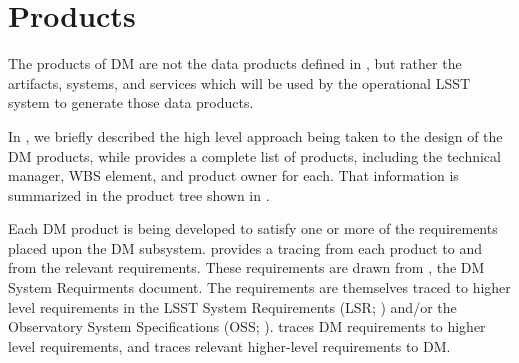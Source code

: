 \section{Products \label{sect:products}}

The products of DM are not the data products defined in ,
but rather the artifacts, systems, and services which will be used by the
operational LSST system to generate those data products.

In , we briefly described the high level approach being taken to the design of the DM products, while  provides a complete list of products, including the technical manager, WBS element, and product owner for each.
That information is summarized in the product tree shown in .

Each DM product is being developed to satisfy one or more of the requirements placed upon the DM subsystem.  provides a tracing from each product to and from the relevant requirements.
These requirements are drawn from , the DM System Requirments document.
The requirements  are themselves traced to higher level requirements in the LSST System Requirements (LSR; ) and/or the Observatory System Specifications (OSS; ).
 traces DM requirements to higher level requirements, and  traces relevant higher-level requirements to DM.

